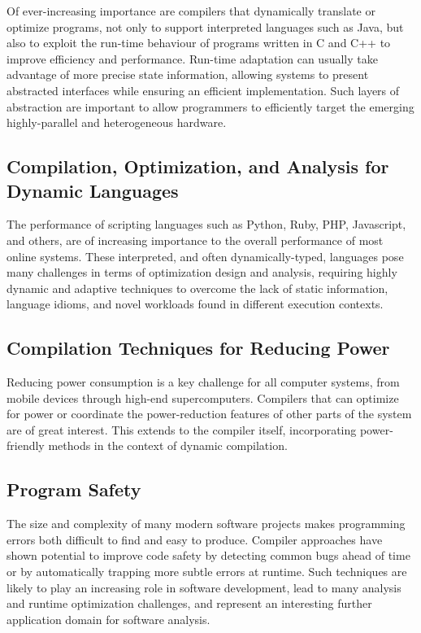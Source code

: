\documentclass[sigconf]{acmart}
\begin{document}
Of ever-increasing importance are compilers that dynamically translate or optimize programs, not only to support interpreted languages such as Java, but also to exploit the run-time behaviour of programs written in C and C++ to improve efficiency and performance. Run-time adaptation can usually take advantage of more precise state information, allowing systems to present abstracted interfaces while ensuring an efficient implementation. Such layers of abstraction are important to allow programmers to efficiently target the emerging highly-parallel and heterogeneous hardware.

\subsection{Compilation, Optimization, and Analysis for Dynamic Languages}

The performance of scripting languages such as Python, Ruby, PHP, Javascript, and others, are of increasing importance to the overall performance of most online systems. These interpreted, and often dynamically-typed, languages pose many  challenges in terms of optimization design and analysis, requiring highly dynamic and adaptive techniques to overcome the lack of static information, language idioms, and novel workloads found in different execution contexts.

\subsection{Compilation Techniques for Reducing Power}

Reducing power consumption is a key challenge for all computer systems, from mobile devices through high-end supercomputers. Compilers that can optimize for power or coordinate the power-reduction features of other parts of the system are of great interest. This extends to the compiler itself, incorporating power-friendly methods in the context of dynamic compilation.

\subsection{Program Safety}

The size and complexity of many modern software projects makes programming errors both difficult to find and easy to produce. Compiler approaches have shown potential to improve code safety by detecting common bugs ahead of time or by automatically trapping more subtle errors at runtime. Such techniques are likely to play an increasing role in software development, lead to many analysis and runtime optimization challenges, and represent an interesting further application domain for software analysis.
\end{document}
